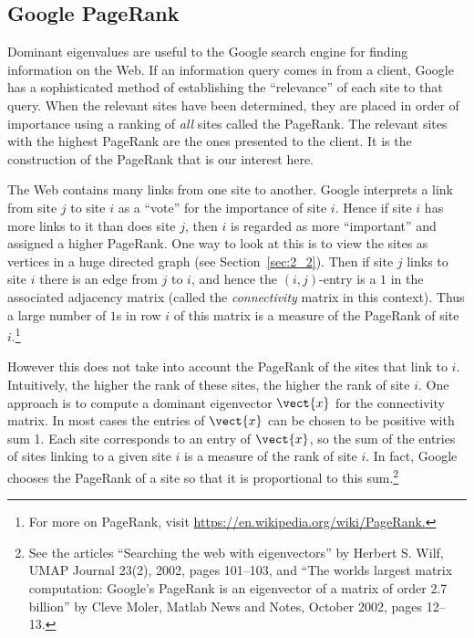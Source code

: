 \subsection*{Google PageRank}

Dominant
 eigenvalues are useful to the Google search engine for finding 
information on the Web. If an information query comes in from a client, 
Google has a sophisticated method of establishing the ``relevance'' of 
each site to that query. When the relevant sites have been determined, 
they are placed in order of importance using a ranking of \textit{all} 
sites called the PageRank. The relevant sites with the highest PageRank 
are the ones presented to the client. It is the construction of the 
PageRank that is our interest here.


The Web contains many links from one site to another. Google interprets a link from site $j$ to site $i$ as a ``vote'' for the importance of site $i$. Hence if site $i$ has more links to it than does site $j$, then $i$
 is regarded as more ``important'' and assigned a higher PageRank. One way
 to look at this is to view the sites as vertices in a huge directed 
graph (see Section~\ref{sec:2_2}). Then if site $j$ links to site $i$ there is an edge from $j$ to $i$, and hence the $(i, j)$-entry is a $1$ in the associated adjacency matrix (called the \textit{connectivity} matrix in this context). Thus a large number of $1$s in row $i$ of this matrix is a measure of the PageRank of site $i$.\footnote{For more on PageRank, visit \href{https://en.wikipedia.org/wiki/PageRank}{https://en.wikipedia.org/wiki/PageRank.}}



However this does not take into account the PageRank of the sites that link to $i$. Intuitively, the higher the rank of these sites, the higher the rank of site $i$. One approach is to compute a dominant eigenvector $\vect{x}$ for the connectivity matrix. In most cases the entries of $\vect{x}$ can be chosen to be positive with sum 1. Each site corresponds to an entry of $\vect{x}$, so the sum of the entries of sites linking to a given site $i$ is a measure of the rank of site $i$. In fact, Google chooses the PageRank of a site so that it is proportional to this sum.\footnote{See
 the articles ``Searching the web with eigenvectors'' by Herbert S. Wilf, 
UMAP Journal 23(2), 2002, pages 101--103, and ``The worlds largest matrix 
computation: Google's PageRank is an eigenvector of a matrix of order 
2.7 billion'' by Cleve Moler, Matlab News and Notes, October 2002, pages 
12--13.}


